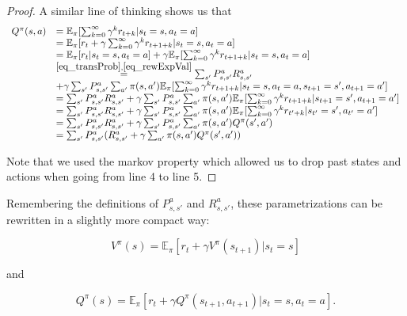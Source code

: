 \documentclass[11pt]{article} %
\begin{document}
\begin{proof}
A similar line of thinking shows us that
	\[
		\begin{array}{rl}
			Q^{\pi}(s,a)	& = \mathbb{E}_{\pi}[\sum_{k=0}^{\infty} \gamma^k r_{t+k} | s_t = s, a_t = a]  \\
						& = \mathbb{E}_{\pi}[r_t + \gamma \sum_{k=0}^{\infty} \gamma^k r_{t+1+k} | s_t = s, a_t = a]  \\
						& = \mathbb{E}_{\pi}[r_t | s_t = s, a_t = a] + \gamma \mathbb{E}_{\pi}[ \sum_{k=0}^{\infty} \gamma^k r_{t+1+k} | s_t = s, a_t = a] \\
						& \overset{\ref{eq_transProb},\ref{eq_rewExpVal}}{=} \sum_{s'} P_{s,s'}^a R_{s,s'}^a \\
						& + \gamma \sum_{s'} P_{s,s'}^a \sum_{a'} \pi(s,a') \mathbb{E}_{\pi}[\sum_{k=0}^{\infty} \gamma^k r_{t+1+k} | s_t = s, a_t = a, s_{t+1} = s', a_{t+1} = a'] \\
						& = \sum_{s'} P_{s,s'}^a R_{s,s'}^a + \gamma \sum_{s'} P_{s,s'}^a \sum_{a'} \pi(s,a') \mathbb{E}_{\pi}[\sum_{k=0}^{\infty} \gamma^k r_{t+1+k} | s_{t+1} = s', a_{t+1} = a'] \\
						& = \sum_{s'} P_{s,s'}^a R_{s,s'}^a + \gamma \sum_{s'} P_{s,s'}^a \sum_{a'} \pi(s,a') \mathbb{E}_{\pi}[\sum_{k=0}^{\infty} \gamma^k r_{t'+k} | s_{t'} = s', a_{t'} = a'] \\
						& = \sum_{s'} P_{s,s'}^a R_{s,s'}^a + \gamma \sum_{s'} P_{s,s'}^a \sum_{a'} \pi(s,a') Q^{\pi}(s',a') \\
						& = \sum_{s'} P_{s,s'}^a ( R_{s,s'}^a + \gamma \sum_{a'} \pi(s,a') Q^{\pi}(s',a') )  \\
		\end{array}
	\]

Note that we used the markov property which allowed us to drop past states and actions when going from line 4 to line 5.

\end{proof}

Remembering the definitions of $P_{s,s'}^a$ and $R_{s,s'}^a$, these parametrizations can be rewritten in a slightly more compact way:

\begin{equation}\label{eq_valueRecursion}
	V^{\pi}(s) =  \mathbb{E}_{\pi}[r_t + \gamma V^{\pi}(s_{t+1}) | s_t = s ]
\end{equation}

and 

\begin{equation}\label{eq_actValRecursion}
	Q^{\pi}(s) = \mathbb{E}_{\pi}[r_t + \gamma Q^{\pi}(s_{t+1},a_{t+1}) | s_t = s, a_t = a].
\end{equation}
\end{document}
